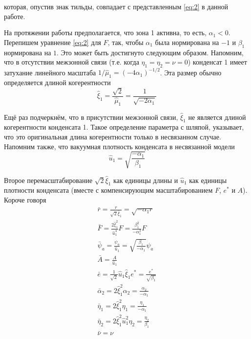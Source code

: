 которая, опустив знак тильды, совпадает с представленным \eqref{eq:2} в
данной работе.

На протяжении работы предполагается, что зона 1 активна, то есть, 
\( \alpha_1 < 0 \). Перепишем уравнение \eqref{eq:2} для \( F \), так, чтобы 
\( \alpha_1 \) была нормирована на \( -1 \) и \( \beta_1 \) нормирована на 
\( 1 \). Это может быть достигнуто следующим образом. Напомним, что в 
отсутствии межзонной связи (т.е. когда \( \eta_1 = \eta_2 = \nu = 0 \)) 
конденсат 1 имеет затухание линейного масштаба 
\( 1/\hat{\mu}_1 = (-4\alpha_1)^{-1/2} \). Эта размер обычно определяется 
длиной когерентности
\begin{equation}
    \hat{\xi}_1 = \frac{\sqrt{2}}{\hat{\mu}_1} = \frac{1}{\sqrt{-2\alpha_1}}
    \label{eq:A-4}
\end{equation}

Ещё раз подчеркнём, что в присутствии межзонной связи, \( \hat{\xi}_1 \) не
является длиной когерентности конденсата 1. Такое определение параметра с 
шляпой, указывает, что это оригинальная длина когерентности только в 
несвязанном случае. Напомним также, что вакуумная плотность конденсата в 
несвязанной модели
\begin{equation}
    \hat{u}_1 = \sqrt{\frac{-\alpha_1}{\beta_1}}
    \label{eq:B-5}
\end{equation}

Второе перемасштабирование \( \sqrt{2}\hat{\xi}_1 \) как единицы длины
и \( \hat{u}_1 \) как единицы плотности конденсата (вместе с компенсирующим
масштабированием \( F \), \( e^* \) и \( A \)). Короче говоря
\begin{gather}
  \bar{r} = \frac{r}{\sqrt{2}\hat{\xi}_1} = \sqrt{-\alpha_1 r} \nonumber \\
  \bar{F} = \frac{2\hat{\xi}^2_1}{\hat{u}^4_1}F =
    \frac{\beta^2_1}{-\alpha^3_1}F \nonumber \\
  \bar{\psi}_a = \frac{\psi_a}{\hat{u}_1} =
    \sqrt{\frac{\beta_1}{-\alpha_1}}\psi_a \nonumber \\
  \bar{A} = \frac{A}{\hat{u}_1} \\
  \bar{e} = \frac{1}{\sqrt{2}}\hat{u}_1\hat{\xi}_1 e^* =
    \frac{e^*}{\sqrt{\beta_1}} \nonumber \\
  \bar{\alpha}_2 = 2\hat{\xi}^2_1 \alpha_2 = \frac{\alpha_2}{-\alpha_1}
    \nonumber \\
  \bar{\eta}_1 = 2\hat{\xi}^2_1 \eta_1 = \frac{\eta_1}{-\alpha_1} \nonumber \\
  \bar{\eta}_2 = 2\hat{\xi}^2_1 \hat{u}^2_1 \eta_2 =
    \frac{\eta_2}{\beta_1} \nonumber \\
  \bar{\nu} = \nu \label{eq:B-6}
\end{gather}

